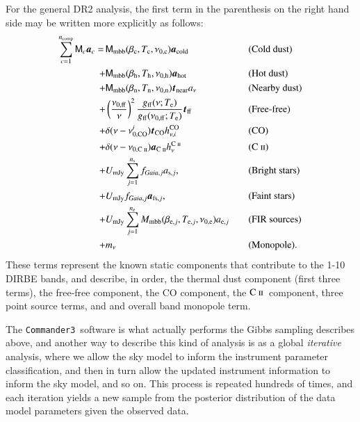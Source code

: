 \documentclass{aa}
\newcommand{\mathsc}[1]{{\normalfont\textsc{#1}}}
\renewcommand{\a}[0]{\vec{a}}
\renewcommand{\t}[0]{\vec{t}}
\newcommand{\M}[0]{\tens{M}}
\newcommand{\cii}{\ensuremath{\mathsc {C\ ii}}}
\def\commanderthree{\texttt{Commander3}}
\def\Tcold{\ifmmode T_\mathrm{c}\else $T_{\mathrm{c}}$\fi}
\def\Thot{\ifmmode T_\mathrm{h}\else $T_{\mathrm{h}}$\fi}
\def\Tnear{\ifmmode T_\mathrm{n}\else $T_{\mathrm{n}}$\fi}
\def\bcold{\ifmmode \beta_\mathrm{c}\else $\beta_{\mathrm{c}}$\fi}
\def\bhot{\ifmmode \beta_\mathrm{h}\else $\beta_{\mathrm{h}}$\fi}
\def\bnear{\ifmmode \beta_\mathrm{n}\else $\beta_{\mathrm{n}}$\fi}
\def\nuzeroff{\ifmmode \nu_{0,\mathrm{ff}}\else $\nu_{0,\mathrm{ff}}$\fi}
\def\nuzerocold{\ifmmode \nu_{0,\mathrm{c}}\else $\nu_{0,\mathrm{c}}$\fi}
\def\nuzerohot{\ifmmode \nu_{0,\mathrm{h}}\else $\nu_{0,\mathrm{h}}$\fi}
\def\nuzeronear{\ifmmode \nu_{0,\mathrm{n}}\else $\nu_{0,\mathrm{n}}$\fi}
\def\Te{\ifmmode T_{\mathrm{e}}\else $T_{\mathrm{e}}$\fi}
\begin{document}
For the general DR2 analysis, the first term in the parenthesis on the right
hand side may be written more explicitly as follows:
\begin{equation}
\label{eq:skymodel}
\begin{aligned}
  \sum_{c=1}^{n_{\mathrm{comp}}} \M_c \a_c  = \,
  &\M_{\mathrm{mbb}}(\bcold,\Tcold,\nuzerocold)\vec{a}_{\mathrm{cold}}
  && \textrm{(Cold dust)} \\
  + &\M_{\mathrm{mbb}}(\bhot,\Thot,\nuzerohot)
  \vec{a}_{\mathrm{hot}} && \textrm{(Hot dust)}\\
  + &\M_{\mathrm{mbb}}(\bnear,\Tnear,\nuzeronear) \t_{\mathrm{near}}
  a_{\nu} && \textrm{(Nearby dust)} \\
  + &\left(\frac{\nuzeroff}{\nu}\right)^2
  \frac{g_{\mathrm{ff}}(\nu;\Te) }{g_{\mathrm{ff}}(\nuzeroff;\Te)}
  \vec{t}_{\mathrm{ff}} && \textrm{(Free-free)} \\
  + &\delta(\nu-\nu_{0,\mathrm{CO}}^i) \t_{\mathrm{CO}}
  h^{\mathrm{CO}}_{\nu,i} && \textrm{(CO)}\\
  + &\delta(\nu-\nu_{0,\cii}) \a_{\cii}
	h^{\cii}_{\nu} && (\cii)\\
  + &U_{\mathrm{mJy}} \sum_{j=1}^{n_{\mathrm{s}}}
  f_{\mathit{Gaia},j} a_{\mathrm{s},j}, &\quad&
  \textrm{(Bright stars)} \\
  + &U_{\mathrm{mJy}} f_{\mathit{Gaia},j} \a_{\mathrm{fs},j}, &\quad&
  \textrm{(Faint stars)} \\  
    + &U_{\mathrm{mJy}} \sum_{j=1}^{n_{\mathrm{e}}}
  M_{\mathrm{mbb}}(\beta_{\mathrm{e},j},
  T_{\mathrm{e},j}, \nu_{0,\mathrm{e}})
  a_{\mathrm{e},j} && \textrm{(FIR sources)}\\
  + &m_{\nu} && \textrm{(Monopole)}. 
\end{aligned}
\end{equation}
These terms represent the known static components that contribute to the 1-10
DIRBE bands, and describe, in order, the thermal dust component (first three
terms), the free-free component, the CO component, the \cii\ component, three
point source terms, and and overall band monopole term.

The \commanderthree\ software \citep{eriksen:2004,seljebotn:2019,bp03} is what
actually performs the Gibbs sampling describes above, and another way to
describe this kind of analysis is as a global \emph{iterative} analysis, where
we allow the sky model to inform the instrument parameter classification, and
then in turn allow the updated instrument information to inform the sky model,
and so on. This process is repeated hundreds of times, and each iteration
yields a new sample from the posterior distribution of the data model
parameters given the observed data.
\end{document}
